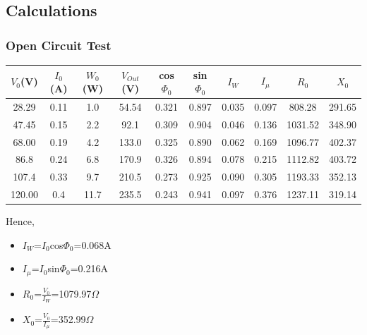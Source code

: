 \documentclass{article}
\begin{document}
\subsection{Calculations}
\subsubsection{Open Circuit Test}
\begin{center}
\begin{tabular}{|c|c|c|c|c|c|c|c|c|c|}
\hline
    $V_{0}$(V) & $I_{0}$(A) & $W_{0}$(W) & $V_{Out}$(V) & cos$\Phi_{0}$ & sin$\Phi_{0}$ & $I_{W}$ & $I_{\mu}$ & $R_{0}$ & $X_{0}$ \\
    \hline
    28.29 & 0.11 & 1.0 & 54.54 & 0.321 & 0.897 & 0.035 & 0.097 & 808.28 & 291.65\\
    47.45 & 0.15 & 2.2 & 92.1 & 0.309 & 0.904 & 0.046 & 0.136 & 1031.52 & 348.90\\
    68.00 & 0.19 & 4.2 & 133.0 & 0.325 & 0.890 & 0.062 & 0.169 & 1096.77 & 402.37\\
    86.8 & 0.24 & 6.8 & 170.9 & 0.326 & 0.894 & 0.078 & 0.215 & 1112.82 & 403.72\\
    107.4 & 0.33 & 9.7 & 210.5 & 0.273 & 0.925 & 0.090 & 0.305 & 1193.33 & 352.13\\
    120.00 & 0.4 & 11.7 & 235.5 & 0.243 & 0.941 & 0.097 & 0.376 & 1237.11 & 319.14\\
\hline
\end{tabular}
\end{center}
\vspace{2mm}
Hence,
\begin{itemize}
    \item $I_{W}$=$I_{0}$cos$\Phi_{0}$=0.068A
    \item $I_{\mu}$=$I_{0}$sin$\Phi_{0}$=0.216A
    \item $R_{0}$=$\frac{V_{0}}{I_{W}}$=1079.97$\Omega$
    \item $X_{0}$=$\frac{V_{0}}{I_{\mu}}$=352.99$\Omega$
\end{itemize}
\end{document}
